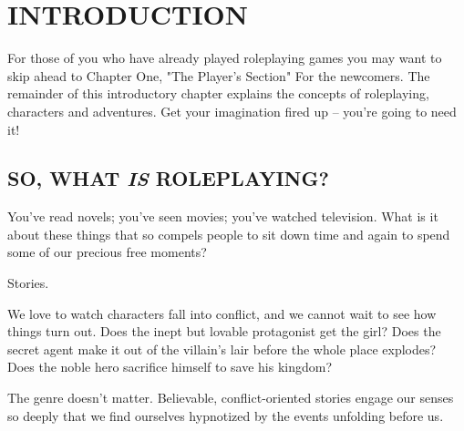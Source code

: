 \documentclass[10pt, a4paper, twoside]{book}
\begin{document}
	\chapter{INTRODUCTION}
	\begin{multicols}{2}
		For those of you who have already played roleplaying games you may want to skip ahead to Chapter One, "The Player's Section" For the newcomers. The remainder of this introductory chapter explains the concepts of roleplaying, characters and adventures. Get your imagination fired up -- you're going to need it!
		\section*{SO, WHAT \emph{IS} ROLEPLAYING?}
		You've read novels; you've seen movies; you've watched television. What is it about these things that so compels people to sit down time and again to spend some of our precious free moments? \par Stories. \par We love to watch characters fall into conflict, and we cannot wait to see how things turn out. Does the inept but lovable protagonist get the girl? Does the secret agent make it out of the villain's lair before the whole place explodes? Does the noble hero sacrifice himself to save his kingdom? \par The genre doesn't matter. Believable, conflict-oriented stories engage our senses so deeply that we find ourselves hypnotized by the events unfolding before us. 
		\begin{mytextbox}

\end{mytextbox}
\end{multicols}
\end{document}
